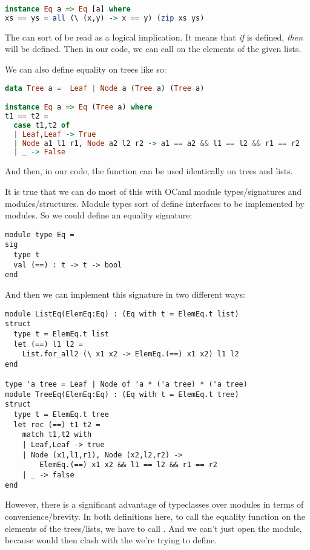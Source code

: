 \documentclass[pageno]{jpaper}
\begin{document}
{{{\begin{lstlisting}[language=Haskell]
instance Eq a => Eq [a] where
xs == ys = all (\ (x,y) -> x == y) (zip xs ys)
\end{lstlisting}

The \lstiH{=>} can sort of be read as a logical implication. It means that \textit{if}  is defined, \textit{then}  will be defined.
Then in our code, we can call \lstiH{==} on the elements of the given lists.

We can also define equality on trees like so:

\begin{lstlisting}[language=Haskell]
data Tree a =  Leaf | Node a (Tree a) (Tree a)

instance Eq a => Eq (Tree a) where
t1 == t2 =
  case t1,t2 of
  | Leaf,Leaf -> True
  | Node a1 l1 r1, Node a2 l2 r2 -> a1 == a2 && l1 == l2 && r1 == r2
  | _ -> False
\end{lstlisting}

And then, in our code, the \lstiH{==} function can be used identically on trees and lists.

It is true that we can do most of this with OCaml module types/signatures and modules/structures. Module types sort of define interfaces to be implemented by modules. So we could define an equality signature:

\begin{lstlisting}
module type Eq = 
sig
  type t
  val (==) : t -> t -> bool
end
\end{lstlisting}

And then we can implement this signature in two different ways:

\begin{lstlisting}
module ListEq(ElemEq:Eq) : (Eq with t = ElemEq.t list)
struct
  type t = ElemEq.t list
  let (==) l1 l2 =
    List.for_all2 (\ x1 x2 -> ElemEq.(==) x1 x2) l1 l2
end

type 'a tree = Leaf | Node of 'a * ('a tree) * ('a tree)
module TreeEq(ElemEq:Eq) : (Eq with t = ElemEq.t tree)
struct
  type t = ElemEq.t tree
  let rec (==) t1 t2 =
    match t1,t2 with
    | Leaf,Leaf -> true
    | Node (x1,l1,r1), Node (x2,l2,r2) ->
        ElemEq.(==) x1 x2 && l1 == l2 && r1 == r2
    | _ -> false
end

\end{lstlisting}

However, there is a significant advantage of typeclasses over modules in terms of convenience/brevity.
In both definitions here, to call the equality function on the elements of the trees/lists,
we have to call . And we can't just open the  module, because
 would then clash with the \lsti{==} we're trying to define.

}}}
\end{document}

